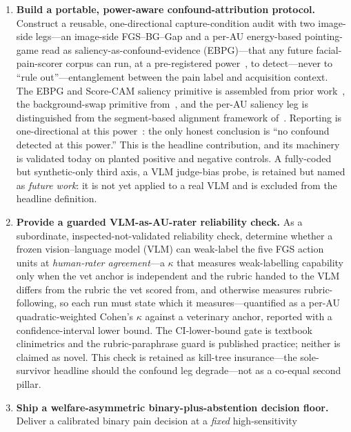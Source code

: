 \begin{enumerate}
  \item \textbf{Build a portable, power-aware confound-attribution protocol.}
    Construct a reusable, one-directional capture-condition audit with two
    image-side legs---an image-side FGS--BG--Gap and a per-AU energy-based
    pointing-game read as saliency-as-confound-evidence (EBPG)---that any future
    facial-pain-scorer corpus can run, at a pre-registered
    power~\autocite{huanghooker2026fairness,singh2023samplesize}, to
    detect---never to ``rule out''---entanglement between the pain label and
    acquisition context. The EBPG and Score-CAM saliency primitive is
    assembled from prior work~\autocite{wang2020scorecam}, the background-swap
    primitive from~\autocite{xiao2021noise,moayeri2022comprehensive}, and the
    per-AU saliency leg is distinguished from the segment-based alignment
    framework of~\autocite{lencioni2025segment}. Reporting is one-directional at
    this power~\autocite{adebayo2022posthoc}: the only honest conclusion is ``no
    confound detected at this power.'' This is the headline contribution, and its
    machinery is validated today on planted positive and negative controls. A
    fully-coded but synthetic-only third axis, a VLM judge-bias probe, is
    retained but named as \emph{future work}: it is not yet applied to a real
    VLM and is excluded from the headline definition.
  \item \textbf{Provide a guarded VLM-as-AU-rater reliability check.} As a
    subordinate, inspected-not-validated reliability check, determine whether
    a frozen vision--language model (VLM) can weak-label the five FGS action units
    at \emph{human-rater agreement}---a $\kappa$ that measures weak-labelling
    capability only when the vet anchor is independent and the rubric handed to
    the VLM differs from the rubric the vet scored from, and otherwise measures
    rubric-following, so each run must state which it measures---quantified as a per-AU quadratic-weighted
    Cohen's $\kappa$ against a veterinary anchor, reported with a confidence-interval
    lower bound. The CI-lower-bound gate is textbook clinimetrics and the
    rubric-paraphrase guard is published practice; neither is claimed as novel.
    This check is retained as kill-tree insurance---the sole-survivor headline
    should the confound leg degrade---not as a co-equal second pillar.
  \item \textbf{Ship a welfare-asymmetric binary-plus-abstention decision floor.}
    Deliver a calibrated binary pain decision at a \emph{fixed} high-sensitivity

\end{enumerate}

